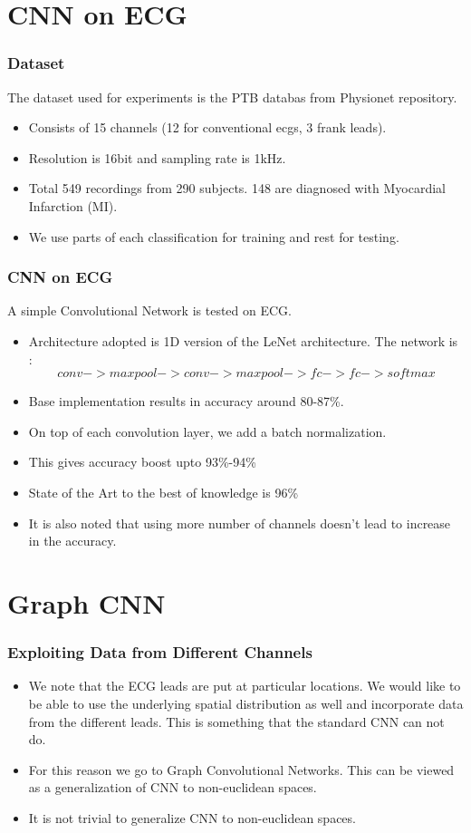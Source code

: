 \documentclass{beamer}
\begin{document}
\section{CNN on ECG}
\begin{frame}
  \frametitle{Dataset}
  The dataset used for experiments is the PTB databas from Physionet repository.
  \begin{itemize}
  \item Consists of 15 channels (12 for conventional ecgs, 3 frank leads).
  \item Resolution is 16bit and sampling rate is 1kHz.
  \item Total 549 recordings from 290 subjects. 148 are diagnosed with Myocardial Infarction (MI).
  \item We use parts of each classification for training and rest for testing.
  \end{itemize}
\end{frame}

\begin{frame}
  \frametitle{CNN on ECG}
  A simple Convolutional Network is tested on ECG.
  \begin{itemize}
  \item Architecture adopted is 1D version of the LeNet architecture. The network is :
    $$conv -> max pool -> conv -> max pool -> fc -> fc -> softmax$$
  \item Base implementation results in accuracy around 80-87\%.
  \item On top of each convolution layer, we add a batch normalization.
  \item This gives accuracy boost upto 93\%-94\%
  \item State of the Art to the best of knowledge is 96\%
  \item It is also noted that using more number of channels doesn't lead to increase in the accuracy.
  \end{itemize}
\end{frame}

\section{Graph CNN}
\begin{frame}
  \frametitle{Exploiting Data from Different Channels}
  \begin{itemize}
  \item We note that the ECG leads are put at particular locations. We would like to be able to use the underlying spatial distribution as well and incorporate data from the different leads. This is something that the standard CNN can not do.
  \item For this reason we go to Graph Convolutional Networks. This can be viewed as a generalization of CNN to non-euclidean spaces.
  \item It is not trivial to generalize CNN to non-euclidean spaces.
  \end{itemize}
\end{frame}
\end{document}
